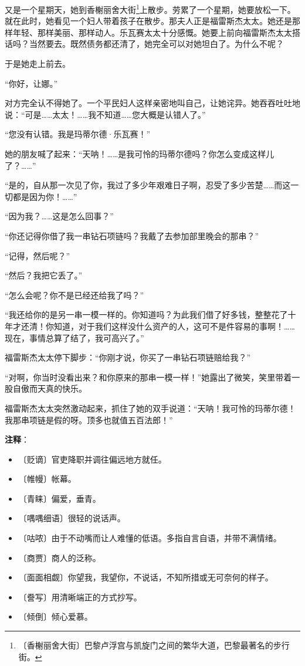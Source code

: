\documentclass[12pt,UTF-8,openany]{ctexbook}
\begin{document}
\begin{large}
    又是一个星期天，她到香榭丽舍大街\footnote{〔香榭丽舍大街〕巴黎卢浮宫与凯旋门之间的繁华大道，巴黎最著名的步行街。}上散步。劳累了一个星期，她要放松一下。就在此时，她看见一个妇人带着孩子在散步。那夫人正是福雷斯杰太太。她还是那样年轻、那样美丽、那样动人。乐瓦赛太太十分感慨。她要上前向福雷斯杰太太搭话吗？当然要去。既然债务都还清了，她完全可以对她坦白了。为什么不呢？
    
    于是她走上前去。
    
    “你好，让娜。”
    
    对方完全认不得她了。一个平民妇人这样亲密地叫自己，让她诧异。她吞吞吐吐地说：“可是……太太！……我不知道……您大概是认错人了。”
    
    “您没有认错。我是玛蒂尔德·乐瓦赛！”
    
    她的朋友喊了起来：“天呐！……是我可怜的玛蒂尔德吗？你怎么变成这样儿了？……”
    
    “是的，自从那一次见了你，我过了多少年艰难日子啊，忍受了多少苦楚……而这一切都是因为你！……”
    
    “因为我？……这是怎么回事？”
    
    “你还记得你借了我一串钻石项链吗？我戴了去参加部里晚会的那串？”
    
    “记得，然后呢？”
    
    “然后？我把它丢了。”
    
    “怎么会呢？你不是已经还给我了吗？”
    
    “我还给你的是另一串一模一样的。你知道吗？为此我们借了好多钱，整整花了十年才还清！你知道，对于我们这样没什么资产的人，这可不是件容易的事啊！……现在，事情总算了结了，我可高兴了。”
    
    福雷斯杰太太停下脚步：“你刚才说，你买了一串钻石项链赔给我？”
    
    “对啊，你当时没看出来？和你原来的那串一模一样！”她露出了微笑，笑里带着一股自傲而天真的快乐。
    
    福雷斯杰太太突然激动起来，抓住了她的双手说道：“天呐！我可怜的玛蒂尔德！我那串项链是假的呀。顶多也就值五百法郎！”
    
\end{large}


\newpage

\textbf{注释}：

\vspace{-1em}

\begin{itemize}
    \setlength\itemsep{-0.2em}
    \item 〔贬谪〕官吏降职并调往偏远地方就任。
    \item 〔帷幔〕帐幕。
    \item 〔青睐〕偏爱，垂青。
    \item 〔喁喁细语〕很轻的说话声。
    \item 〔咕哝〕由于不动嘴而让人难懂的低语。多指自言自语，并带不满情绪。
    \item 〔商贾〕商人的泛称。
    \item 〔面面相觑〕你望我，我望你，不说话，不知所措或无可奈何的样子。
    \item 〔誊写〕用清晰端正的方式抄写。
    \item 〔倾倒〕倾心爱慕。
\end{itemize}
\end{document}
